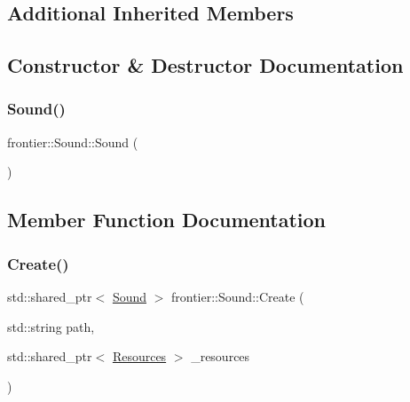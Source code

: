\subsection*{Additional Inherited Members}


\subsection{Constructor \& Destructor Documentation}
\mbox{\label{classfrontier_1_1_sound_ab0940b4b5e83737b071a4334c2a7850c}} 
\subsubsection{\texorpdfstring{Sound()}{Sound()}}
{\footnotesize\ttfamily frontier\+::\+Sound\+::\+Sound (\begin{DoxyParamCaption}{ }\end{DoxyParamCaption})}



\subsection{Member Function Documentation}
\mbox{\label{classfrontier_1_1_sound_ab605185af084b415e84a1eac043c7fb7}} 
\subsubsection{\texorpdfstring{Create()}{Create()}}
{\footnotesize\ttfamily std\+::shared\+\_\+ptr$<$ \hyperlink{classfrontier_1_1_sound}{Sound} $>$ frontier\+::\+Sound\+::\+Create (\begin{DoxyParamCaption}\item[{std\+::string}]{path,  }\item[{std\+::shared\+\_\+ptr$<$ \hyperlink{classfrontier_1_1_resources}{Resources} $>$}]{\+\_\+resources }\end{DoxyParamCaption})\hspace{0.3cm}{\ttfamily [static]}}

\mbox{\label{classfrontier_1_1_sound_ac175fd9a053e4126ccfb3b5e008e059d}} 
